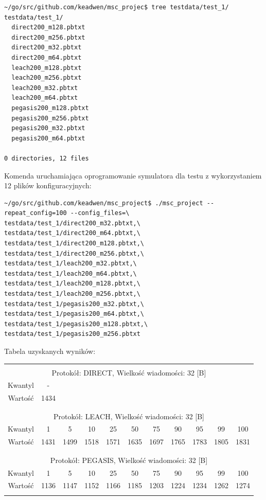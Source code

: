 \documentclass[a4paper,12pt,twoside,openany]{report}
\begin{document}
\begin{lstlisting}
~/go/src/github.com/keadwen/msc_projec$ tree testdata/test_1/
testdata/test_1/
  direct200_m128.pbtxt
  direct200_m256.pbtxt
  direct200_m32.pbtxt
  direct200_m64.pbtxt
  leach200_m128.pbtxt
  leach200_m256.pbtxt
  leach200_m32.pbtxt
  leach200_m64.pbtxt
  pegasis200_m128.pbtxt
  pegasis200_m256.pbtxt
  pegasis200_m32.pbtxt
  pegasis200_m64.pbtxt

0 directories, 12 files
\end{lstlisting}

Komenda uruchamiająca oprogramowanie symulatora dla testu z wykorzystaniem 12 plików konfiguracyjnych:

\begin{lstlisting}
~/go/src/github.com/keadwen/msc_project$ ./msc_project --repeat_config=100 --config_files=\
testdata/test_1/direct200_m32.pbtxt,\
testdata/test_1/direct200_m64.pbtxt,\
testdata/test_1/direct200_m128.pbtxt,\
testdata/test_1/direct200_m256.pbtxt,\
testdata/test_1/leach200_m32.pbtxt,\
testdata/test_1/leach200_m64.pbtxt,\
testdata/test_1/leach200_m128.pbtxt,\
testdata/test_1/leach200_m256.pbtxt,\
testdata/test_1/pegasis200_m32.pbtxt,\
testdata/test_1/pegasis200_m64.pbtxt,\
testdata/test_1/pegasis200_m128.pbtxt,\
testdata/test_1/pegasis200_m256.pbtxt
\end{lstlisting}

Tabela uzyskanych wyników:

\begin{longtable}{*{11}{c}}
\toprule \\*
\multicolumn{11}{c}{Protokół: DIRECT, Wielkość wiadomości: 32 [B]} \\*
Kwantyl	& -	\\*
Wartość	& 1434	\\*
\midrule \\*
\\*
\multicolumn{11}{c}{Protokół: LEACH, Wielkość wiadomości: 32 [B]} \\*
Kwantyl	& 1	& 5	& 10	& 25	& 50	& 75	& 90	& 95	& 99	& 100	\\*
Wartość	& 1431	& 1499	& 1518	& 1571	& 1635	& 1697	& 1765	& 1783	& 1805	& 1831	\\*
\midrule \\*
\\*
\multicolumn{11}{c}{Protokół: PEGASIS, Wielkość wiadomości: 32 [B]} \\*
Kwantyl	& 1	& 5	& 10	& 25	& 50	& 75	& 90	& 95	& 99	& 100	\\*
Wartość	& 1136	& 1147	& 1152	& 1166	& 1185	& 1203	& 1224	& 1234	& 1262	& 1274	\\*
\bottomrule \\*
\end{longtable}
\end{document}

